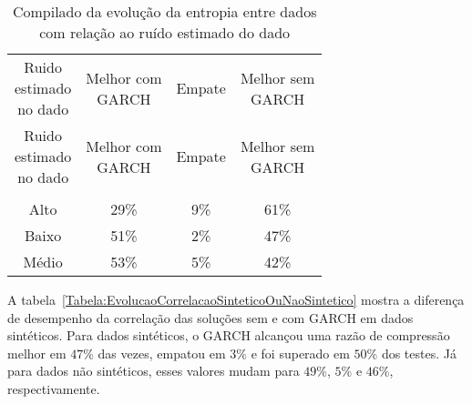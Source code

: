  \begin{center}
\begin{longtable}{cccc}
\toprule
\rowcolor{white}
 \caption{Compilado da evolução da entropia entre dados com relação ao ruído
 estimado do dado}\label{Tabela:EvolucaoCorrelacaoRuidoEstimado} \\
\midrule
\rowcolor{white}
   \specialcell{Ruido\\estimado\\no dado} & \specialcell{Melhor com\\GARCH} &
   Empate & \specialcell{Melhor sem\\GARCH} \\
\midrule
\endfirsthead
\midrule
\rowcolor{white}
   \specialcell{Ruido\\estimado\\no dado} & \specialcell{Melhor com\\GARCH} &
   Empate & \specialcell{Melhor sem\\GARCH} \\
\toprule
\endhead
\midrule \\ %
\endfoot
\bottomrule
\endlastfoot
    Alto  & 29\%  & 9\%   & 61\% \\
    Baixo & 51\%  & 2\%   & 47\% \\
    Médio & 53\%  & 5\%   & 42\% \\
\end{longtable}
\end{center}

A tabela~\ref{Tabela:EvolucaoCorrelacaoSinteticoOuNaoSintetico} mostra a
diferença de desempenho da correlação das soluções sem e com GARCH em dados
sintéticos. Para dados sintéticos, o GARCH alcançou uma razão de compressão
melhor em $47\%$ das vezes, empatou em $3\%$ e foi superado em $50\%$ dos testes. Já para dados não
sintéticos, esses valores mudam para $49\%$, $5\%$ e $46\%$, respectivamente.


